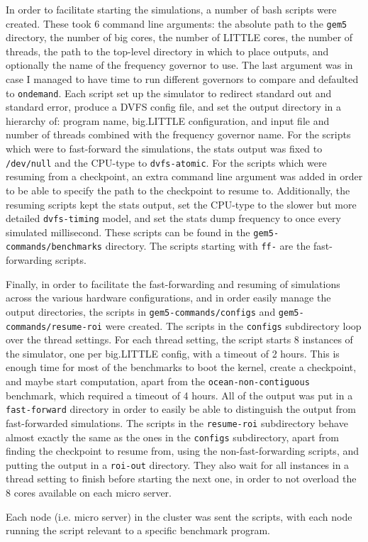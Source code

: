     In order to facilitate starting the simulations, a number of bash scripts 
    were created. These took 6 command line arguments: the absolute path to the 
    \texttt{gem5} directory, the number of big cores, the number of LITTLE 
    cores, the number of threads, the path to the top-level directory in which 
    to place outputs, and optionally the name of the frequency governor to use. 
    The last argument was in case I managed to have time to run different 
    governors to compare and defaulted to \texttt{ondemand}. Each script set up 
    the simulator to redirect standard out and standard error, produce a DVFS 
    config file, and set the output directory in a hierarchy of: program name, 
    big.LITTLE configuration, and input file and number of threads combined 
    with the frequency governor name. For the scripts which were to fast-forward
    the simulations, the stats output was fixed to \texttt{/dev/null} and the 
    CPU-type to \texttt{dvfs-atomic}. For the scripts which were resuming from 
    a checkpoint, an extra command line argument was added in order to be able 
    to specify the path to the checkpoint to resume to. Additionally, the 
    resuming scripts kept the stats output, set the CPU-type to the slower but 
    more detailed \texttt{dvfs-timing} model, and set the stats dump frequency 
    to once every simulated millisecond. These scripts can be found in the 
    \texttt{gem5-commands/benchmarks} directory. The scripts starting with 
    \texttt{ff-} are the fast-forwarding scripts.
    
    Finally, in order to facilitate the fast-forwarding and resuming of 
    simulations across the various hardware configurations, and in order easily 
    manage the output directories, the scripts in \texttt{gem5-commands/configs}
    and \texttt{gem5-commands/resume-roi} were created. The scripts in the 
    \texttt{configs} subdirectory loop over the thread settings. For each thread
    setting, the script starts 8 instances of the simulator, one per big.LITTLE 
    config, with a timeout of 2 hours. This is enough time for most of the 
    benchmarks to boot the kernel, create a checkpoint, and maybe start 
    computation, apart from the \texttt{ocean-non-contiguous} benchmark, which 
    required a timeout of 4 hours. All of the output was put in a 
    \texttt{fast-forward} directory in order to easily be able to distinguish 
    the output from fast-forwarded simulations. The scripts in the 
    \texttt{resume-roi} subdirectory behave almost exactly the same as the ones 
    in the \texttt{configs} subdirectory, apart from finding the checkpoint to 
    resume from, using the non-fast-forwarding scripts, and putting the output 
    in a \texttt{roi-out} directory. They also wait for all instances in a 
    thread setting to finish before starting the next one, in order to not 
    overload the 8 cores available on each micro server.
    
    Each node (i.e. micro server) in the cluster was sent the scripts, with each
    node running the script relevant to a specific benchmark program.
